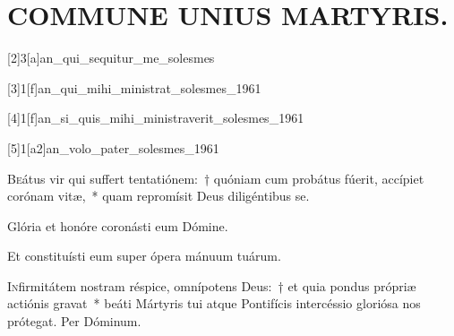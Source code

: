 \documentclass[vesperale_romanum.tex]{subfiles}
\begin{document}
\section[Commune Unius Martyris]{COMMUNE UNIUS MARTYRIS.}




[2]{3}[a]{an_qui_sequitur_me_solesmes}

[3]{1}[f]{an_qui_mihi_ministrat_solesmes_1961}

[4]{1}[f]{an_si_quis_mihi_ministraverit_solesmes_1961}

[5]{1}[a2]{an_volo_pater_solesmes_1961}

\label{cap_commune_unius_martyris}
{}

\lettrine{B}{e}átus vir qui suffert tentatiónem:~† quóniam cum probátus fúerit, accípiet corónam vitæ,~* quam repromísit Deus diligéntibus se.

\hymnus

\label{hy_deus_tuorum_militum_solesmes_1961}


\altertonus


\vv Glória et honóre coronásti eum Dómine.

\rr Et constituísti eum super ópera mánuum tuárum.

\label{an_iste_sanctus_solesmes_1961}
{}


\lettrine{I}{n}firmitátem nostram réspice, omnípotens Deus:~† et quia pondus própriæ actiónis gravat~* beáti  \nomen{} Mártyris tui atque Pontifícis intercéssio gloriósa nos prótegat. Per Dóminum.

\aliaoratio
\end{document}
